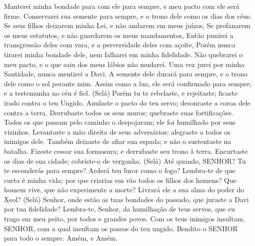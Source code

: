 {Manterei minha bondade para com ele para sempre, e meu pacto com ele será firme.
Conservarei sua semente para sempre, e o trono dele como os dias dos céus.
Se seus filhos deixarem minha Lei, e não andarem em meus juízos,
Se profanarem os meus estatutos, e não guardarem os meus mandamentos,
Então punirei a transgressão deles com vara, e a perversidade deles com açoite,
Porém nunca tirarei minha bondade dele, nem falharei em minha fidelidade.
Não quebrarei o meu pacto, e o que saiu dos meus lábios não mudarei.
Uma vez jurei por minha Santidade,
{} nunca mentirei a Davi.
A semente dele durará para sempre, e o trono dele
{} como o sol perante mim.
Assim como a lua, ele será confirmado para sempre; e a testemunha no céu é fiel. (Selá)
Porém tu te rebelaste, e
{} rejeitaste; ficaste irado contra o teu Ungido.
Anulaste o pacto do teu servo; desonraste a coroa dele
{} contra a terra.
Derrubaste todos os seus muros; quebraste suas fortificações.
Todos os que passam pelo caminho o despojaram; ele foi humilhado por seus vizinhos.
Levantaste a mão direita de seus adversários; alegraste a todos os inimigos dele.
Também deixaste de afiar sua espada; e não o sustentaste na batalha.
Fizeste cessar sua formosura; e derrubaste seu trono à terra.
Encurtaste os dias de sua cidade; cobriste-o de vergonha. (Selá)
Até quando, SENHOR? Tu te esconderás para sempre? Arderá teu furor como o fogo?
Lembra-te de que curta é minha vida; por que criarias em vão todos os filhos dos homens?
Que homem vive, que não experimente a morte? Livrará ele a sua alma do poder do Xeol?
 (Selá)
Senhor, onde estão as tuas bondades do passado, que juraste a Davi por tua fidelidade?
Lembra-te, Senhor, da humilhação de teus servos, que eu trago em meu peito,
{} por todos e grandes povos.
Com
{} os teus inimigos insultam, SENHOR, com a qual insultam os passos do teu ungido.
Bendito
{} o SENHOR para todo o sempre. Amém, e Amém.

}

